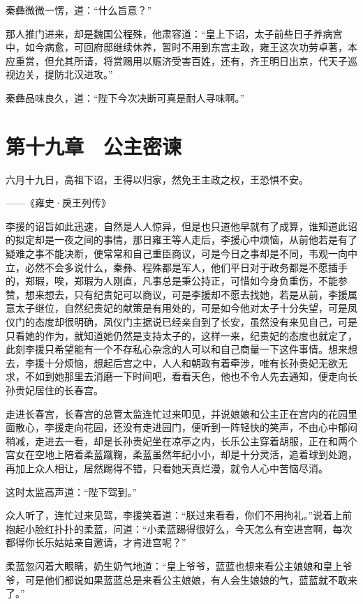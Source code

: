 秦彝微微一愣，道：“什么旨意？”

那人推门进来，却是魏国公程殊，他肃容道：“皇上下诏，太子前些日子养病宫中，如今病愈，可回府邸继续休养，暂时不用到东宫主政，雍王这次功劳卓著，本应重赏，但允其所请，将赏赐用以赈济受害百姓，还有，齐王明日出京，代天子巡视边关，提防北汉进攻。”

秦彝品味良久，道：“陛下今次决断可真是耐人寻味啊。”

\chapter{第十九章　公主密谏}

六月十九日，高祖下诏，王得以归家，然免王主政之权，王恐惧不安。

——《雍史·戾王列传》

李援的诏旨如此迅速，自然是人人惊异，但是也只道他早就有了成算，谁知道此诏的拟定却是一夜之间的事情，那日雍王等人走后，李援心中烦恼，从前他若是有了疑难之事不能决断，便常常和自己重臣商议，可是今日之事却是不同，韦观一向中立，必然不会多说什么，秦彝、程殊都是军人，他们平日对于政务都是不愿插手的，郑瑕，唉，郑瑕为人刚直，凡事总是秉公持正，可惜如今身负重伤，不能参赞，想来想去，只有纪贵妃可以商议，可是李援却不愿去找她，若是从前，李援属意太子继位，自然纪贵妃的献策是有用处的，可是如今他对太子十分失望，可是凤仪门的态度却很明确，凤仪门主据说已经亲自到了长安，虽然没有来见自己，可是只看她的作为，就知道她仍然是支持太子的，这样一来，纪贵妃的态度也就定了，此刻李援只希望能有一个不存私心杂念的人可以和自己商量一下这件事情。想来想去，李援十分烦恼，想起后宫之中，人人和朝政有着牵涉，唯有长孙贵妃无欲无求，不如到她那里去消磨一下时间吧，看看天色，他也不令人先去通知，便走向长孙贵妃居住的长春宫。

走进长春宫，长春宫的总管太监连忙过来叩见，并说娘娘和公主正在宫内的花园里面散心，李援走向花园，还没有走进园门，便听到一阵轻快的笑声，不由心中郁闷稍减，走进去一看，却是长孙贵妃坐在凉亭之内，长乐公主穿着胡服，正在和两个宫女在空地上陪着柔蓝蹴鞠，柔蓝虽然年纪小小，却是十分灵活，追着球到处跑，再加上众人相让，居然踢得不错，只看她天真烂漫，就令人心中苦恼尽消。

这时太监高声道：“陛下驾到。”

众人听了，连忙过来见驾，李援笑着道：“朕过来看看，你们不用拘礼。”说着上前抱起小脸红扑扑的柔蓝，问道：“小柔蓝踢得很好么，今天怎么有空进宫啊，每次都得你长乐姑姑亲自邀请，才肯进宫呢？”

柔蓝忽闪着大眼睛，奶生奶气地道：“皇上爷爷，蓝蓝也想来看公主娘娘和皇上爷爷，可是他们都说如果蓝蓝总是来看公主娘娘，有人会生娘娘的气，蓝蓝就不敢来了。”

